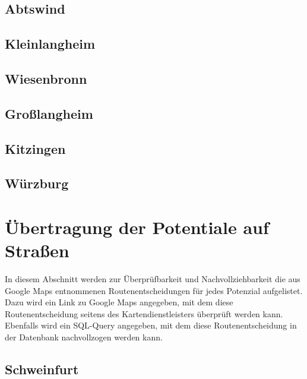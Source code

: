 \documentclass[fontsize=12pt,a4paper]{scrreprt}
\begin{document}
            \subsection{Abtswind}
            

            \subsection{Kleinlangheim}
            

            \subsection{Wiesenbronn}
            

            \subsection{Großlangheim}
            

            \subsection{Kitzingen}
            

            \subsection{Würzburg}
            

        \section{Übertragung der Potentiale auf Straßen}
                In diesem Abschnitt werden zur Überprüfbarkeit und Nachvollziehbarkeit die aus Google Maps entnommenen Routenentscheidungen für jedes Potenzial aufgelistet. Dazu wird ein Link zu Google Maps angegeben, mit dem diese Routenentscheidung seitens des Kartendienstleisters überprüft werden kann. Ebenfalls wird ein SQL-Query angegeben, mit dem diese Routenentscheidung in der Datenbank nachvollzogen werden kann.
                \subsection{Schweinfurt}
                
\end{document}
